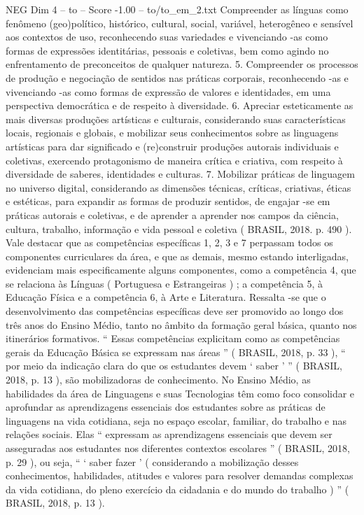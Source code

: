 \begin{textsample}{NEG Dim 4 – to – Score -1.00 – to/to\_em\_2.txt}
Compreender as línguas como fenômeno (geo)político, histórico, cultural, social, variável, heterogêneo e sensível aos contextos de uso, reconhecendo suas variedades e vivenciando -as como formas de expressões identitárias, pessoais e coletivas, bem como agindo no enfrentamento de preconceitos de qualquer natureza. 5.
Compreender os processos de produção e negociação de sentidos nas práticas corporais, reconhecendo -as e vivenciando -as como formas de expressão de valores e identidades, em uma perspectiva democrática e de respeito à diversidade. 6.
Apreciar esteticamente as mais diversas produções artísticas e culturais, considerando suas características locais, regionais e globais, e mobilizar seus conhecimentos sobre as linguagens artísticas para dar significado e (re)construir produções autorais individuais e coletivas, exercendo protagonismo de maneira crítica e criativa, com respeito à diversidade de saberes, identidades e culturas. 7.
Mobilizar práticas de linguagem no universo digital, considerando as dimensões técnicas, críticas, criativas, éticas e estéticas, para expandir as formas de produzir sentidos, de engajar -se em práticas autorais e coletivas, e de aprender a aprender nos campos da ciência, cultura, trabalho, informação e vida pessoal e coletiva ( BRASIL, 2018. p. 490 ).
Vale destacar que as competências específicas 1, 2, 3 e 7 perpassam todos os componentes curriculares da área, e que as demais, mesmo estando interligadas, evidenciam mais especificamente alguns componentes, como a competência 4, que se relaciona às Línguas ( Portuguesa e Estrangeiras ) ; a competência 5, à Educação Física e a competência 6, à Arte e Literatura.
Ressalta -se que o desenvolvimento das competências específicas deve ser promovido ao longo dos três anos do Ensino Médio, tanto no âmbito da formação geral básica, quanto nos itinerários formativos. “ Essas competências explicitam como as competências gerais da Educação Básica se expressam nas áreas ” ( BRASIL, 2018, p. 33 ), “ por meio da indicação clara do que os estudantes devem ‘ saber ’ ” ( BRASIL, 2018, p. 13 ), são mobilizadoras de conhecimento.
No Ensino Médio, as habilidades da área de Linguagens e suas Tecnologias têm como foco consolidar e aprofundar as aprendizagens essenciais dos estudantes sobre as práticas de linguagens na vida cotidiana, seja no espaço escolar, familiar, do trabalho e nas relações sociais.
Elas “ expressam as aprendizagens essenciais que devem ser asseguradas aos estudantes nos diferentes contextos escolares ” ( BRASIL, 2018, p. 29 ), ou seja, “ ‘ saber fazer ’ ( considerando a mobilização desses conhecimentos, habilidades, atitudes e valores para resolver demandas complexas da vida cotidiana, do pleno exercício da cidadania e do mundo do trabalho ) ” ( BRASIL, 2018, p. 13 ).

\end{textsample}
